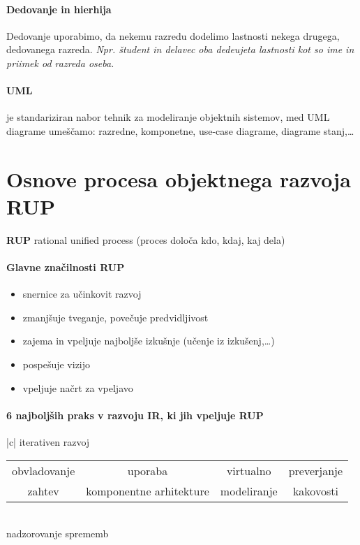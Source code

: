 \documentclass[a4paper,12pt]{report}
\begin{document}
      \paragraph{Dedovanje in hierhija} Dedovanje uporabimo, da nekemu razredu dodelimo lastnosti nekega drugega, dedovanega razreda.
      \textit{Npr. študent in delavec oba dedeujeta lastnosti kot so ime in priimek od razreda oseba.}

      \paragraph{UML} je standariziran nabor tehnik za modeliranje objektnih sistemov, med UML diagrame umeščamo: razredne, komponetne, use-case diagrame, diagrame stanj,\dots

      \section{Osnove procesa objektnega razvoja RUP}
      \textbf{RUP} rational unified process (proces določa kdo, kdaj, kaj dela)

      \paragraph{Glavne značilnosti RUP}
         \begin{itemize}
            \item snernice za učinkovit razvoj
            \item zmanjšuje tveganje, povečuje predvidljivost
            \item zajema in vpeljuje najboljše izkušnje (učenje iz izkušenj,\dots)
            \item pospešuje vizijo
            \item vpeljuje načrt za vpeljavo
         \end{itemize}

      \paragraph{6 najboljših praks v razvoju IR, ki jih vpeljuje RUP}
         \begin{center}
            \begin{tabular}{|c|}
               \hline
               iterativen razvoj\\
               \hline
               \begin{tabular}{c|c|c|c}
                  obvladovanje & uporaba  & virtualno & preverjanje\\
                  zahtev & komponentne arhitekture & modeliranje & kakovosti\\
               \end{tabular}\\
               \hline
               nadzorovanje sprememb\\
               \hline
            \end{tabular}
         \end{center}
\end{document}
